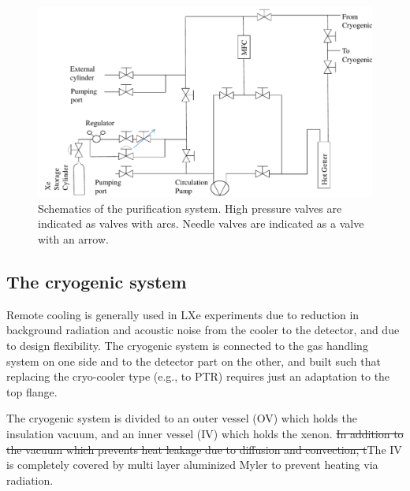 \begin{figure}[h]
\centerline{\includegraphics[width=0.75\linewidth]{GasSchematics.png}}
\caption{Schematics of the purification system. High pressure valves are indicated as 
valves with arcs. Needle valves are indicated as 
a valve with an arrow.}
\label{fig:gasSchematic}
\end{figure}


\subsection{The cryogenic system}
\label{subsec:cryo}

Remote cooling is generally used in LXe experiments due to reduction in background radiation and acoustic noise from the cooler to the detector, and due to design flexibility. The cryogenic system is connected to the gas handling system on 
one side and to the detector part on the other, and built such that replacing the cryo-cooler type (e.g., to PTR) requires just an adaptation to the top flange.


The cryogenic system is divided to an outer vessel (OV) which holds 
the insulation vacuum, and an inner vessel (IV) which holds the xenon. \sout{In addition to the vacuum which prevents heat leakage due to diffusion and convection, t}The IV is completely covered by multi layer aluminized Myler to prevent heating via radiation.  

